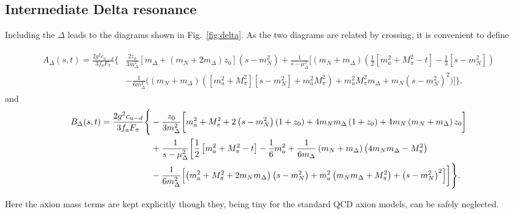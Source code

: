 \documentclass[reprint,amssymb,amsmath,floatfix,aps,prd,groupedaddress,nofootinbib]{revtex4-2}
\begin{document}
\subsection{Intermediate Delta resonance}\label{ssec:delta}

\begin{figure*}[t]
\qquad
{}
\caption{Tree-level contributions to $aN\to \pi N$ with an intermediate $\Delta$ state.}
\label{fig:delta}
\end{figure*}
Including the $\Delta$ leads to the diagrams shown in Fig.~\ref{fig:delta}. As the two diagrams are
related by crossing, it is convenient to define
\begin{widetext}
\begin{align}\label{eq:Adelta}
\begin{split}
A_\Delta (s,t) = \frac{2 g^2 c_{u-d}}{3f_a F_\pi}\Biggl\{ & \frac{2z_0}{3m_\Delta^2} \left[m_\Delta+\left(m_N+2m_\Delta \right)z_0 \right] \left(s-m_N^2\right)  + \frac{1}{s-\mu_\Delta^2} \biggl[\left(m_N+m_\Delta\right)\left(\frac{1}{2}\left[m_a^2+M_\pi^2-t\right]-\frac{1}{3}\left[s-m_N^2\right]\right) \\
&  -\frac{1}{6m_\Delta^2}\biggl(\left(m_N+m_\Delta\right)\left(\left[m_a^2+M_\pi^2\right]\left[s-m_N^2\right]+m_a^2M_\pi^2\right)  +m_a^2M_\pi^2 m_\Delta+m_N\left(s-m_N^2\right)^2\biggr) \biggr]\Biggr\},
\end{split}
\end{align}
and
\begin{align}\label{eq:Bdelta}
\begin{split}
B_\Delta (s,t) = \frac{2 g^2 c_{u-d}}{3f_a F_\pi}\Biggl\{ & -\frac{z_0}{3m_\Delta^2}\biggl[m_a^2+M_\pi^2+2
\left(s-m_N^2\right)\left(1+z_0\right)  +4m_N m_\Delta\left(1+z_0\right)+4m_N\left(m_N+m_\Delta\right)z_0
\biggr]\\
& + \frac{1}{s-\mu_\Delta^2} \biggl[\frac{1}{2} \left[m_a^2+M_\pi^2-t\right]-\frac{1}{6}m_a^2 +\frac{1}{6m_\Delta}\left(m_N+m_\Delta\right)\left(4m_N m_\Delta - M_\pi^2\right) \\
&  -\frac{1}{6m_\Delta^2}\Bigl[\left(m_a^2+M_\pi^2+2m_N m_\Delta\right)\left(s-m_N^2\right) + m_a^2\left(m_N m_\Delta + M_\pi^2\right) + \left(s-m_N^2\right)^2 \Bigr]\biggr] \Biggr\} .
\end{split}
\end{align}
\end{widetext}
Here the axion mass terms are kept explicitly though they, being tiny for the standard QCD axion models, can be safely neglected.
\end{document}
